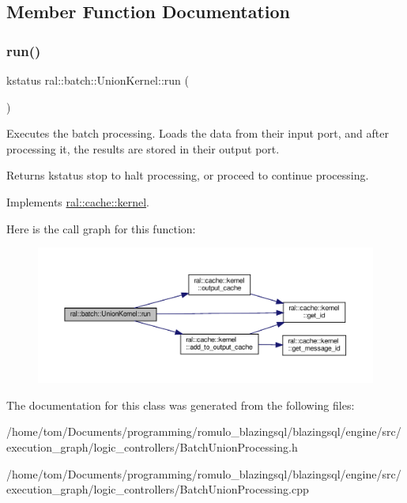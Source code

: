 \subsection{Member Function Documentation}
\mbox{\label{classral_1_1batch_1_1UnionKernel_a30f9875564a6057113b2fd7debfdf7a9}} 
\subsubsection{\texorpdfstring{run()}{run()}}
{\footnotesize\ttfamily kstatus ral\+::batch\+::\+Union\+Kernel\+::run (\begin{DoxyParamCaption}{ }\end{DoxyParamCaption})\hspace{0.3cm}{\ttfamily [virtual]}}



Executes the batch processing. Loads the data from their input port, and after processing it, the results are stored in their output port. 

\begin{DoxyReturn}{Returns}
kstatus \textquotesingle{}stop\textquotesingle{} to halt processing, or \textquotesingle{}proceed\textquotesingle{} to continue processing. 
\end{DoxyReturn}


Implements \hyperlink{classral_1_1cache_1_1kernel_a735b081cccae9574924e74ea6d293ef7}{ral\+::cache\+::kernel}.

Here is the call graph for this function\+:\nopagebreak
\begin{figure}[H]
\begin{center}
\leavevmode
\includegraphics[width=350pt]{classral_1_1batch_1_1UnionKernel_a30f9875564a6057113b2fd7debfdf7a9_cgraph}
\end{center}
\end{figure}


The documentation for this class was generated from the following files\+:\begin{DoxyCompactItemize}
\item 
/home/tom/\+Documents/programming/romulo\+\_\+blazingsql/blazingsql/engine/src/execution\+\_\+graph/logic\+\_\+controllers/Batch\+Union\+Processing.\+h\item 
/home/tom/\+Documents/programming/romulo\+\_\+blazingsql/blazingsql/engine/src/execution\+\_\+graph/logic\+\_\+controllers/Batch\+Union\+Processing.\+cpp\end{DoxyCompactItemize}

